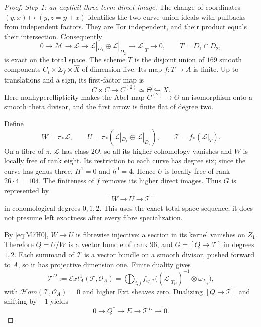 \documentclass[11pt,a4paper]{article}
\theoremstyle{definition}\newtheorem{definition}[theorem]{Definition}
\theoremstyle{remark}\newtheorem{remark}[theorem]{Remark}
\newcommand{\cO}{\mathcal O}\newcommand{\CH}{\operatorname{CH}}\newcommand{\cl}{\operatorname{cl}}
\begin{document}
\begin{proof}
\emph{Step 1: an explicit three-term direct image.}
The change of coordinates $(y,x)\mapsto(y,z=y+x)$ identifies the two
curve-union ideals with pullbacks from independent factors. They are Tor
independent, and their product equals their intersection. Consequently
\[
 0\longrightarrow\mathcal M\longrightarrow\mathcal L
 \longrightarrow\mathcal L|_{D_1}\oplus\mathcal L|_{D_2}
 \longrightarrow\mathcal L|_T\longrightarrow0,
 \qquad T=D_1\cap D_2,
\]
is exact on the total space. The scheme $T$ is the disjoint union of
$169$ smooth components $C_i\times\Sigma_j\times\widehat X$ of dimension
five. Its map $f:T\to A$ is finite. Up to translations and a sign, its
first-factor map is
\[
 C\times C\longrightarrow C^{(2)}\simeq\Theta\hookrightarrow X.
\]
Here nonhyperellipticity makes the Abel map $C^{(2)}\to\Theta$ an
isomorphism onto a smooth theta divisor, and the first arrow is finite
flat of degree two.

Define
\[
 W=\pi_*\mathcal L,\qquad
 U=\pi_*(\mathcal L|_{D_1}\oplus\mathcal L|_{D_2}),\qquad
 \mathcal T=f_*(\mathcal L|_T).
\]
On a fibre of $\pi$, $\mathcal L$ has class $2\Theta$, so all its higher
cohomology vanishes and $W$ is locally free of rank eight. Its restriction
to each curve has degree six; since the curve has genus three,
$H^1=0$ and $h^0=4$. Hence $U$ is locally free of rank $26\cdot4=104$.
The finiteness of $f$ removes its higher direct images. Thus $G$ is
represented by
\[
 [\,W\longrightarrow U\longrightarrow\mathcal T\,]
\]
in cohomological degrees $0,1,2$. This uses the exact total-space
sequence; it does not presume left exactness after every fibre
specialization.

By \eqref{eq:M7H0}, $W\to U$ is fibrewise injective: a section in its
kernel vanishes on $Z_1$. Therefore $Q=U/W$ is a vector bundle of rank
$96$, and $G=[Q\to\mathcal T]$ in degrees $1,2$.
Each summand of $\mathcal T$ is a vector bundle on a smooth divisor,
pushed forward to $A$, so it has projective dimension one. Finite
duality gives
\[
 \mathcal T^D:=\mathcal E xt^1_A(\mathcal T,\cO_A)
 =\bigoplus_{i,j}f_{ij,*}
       \bigl((\mathcal L|_{T_{ij}})^{-1}\otimes\omega_{T_{ij}}\bigr),
\]
with $\mathcal H om(\mathcal T,\cO_A)=0$ and higher Ext sheaves zero.
Dualizing $[Q\to\mathcal T]$ and shifting by $-1$ yields
\begin{equation}\label{eq:M7extension}
 0\longrightarrow Q^*\longrightarrow E
          \longrightarrow\mathcal T^D\longrightarrow0.
\end{equation}


\end{proof}
\end{document}
